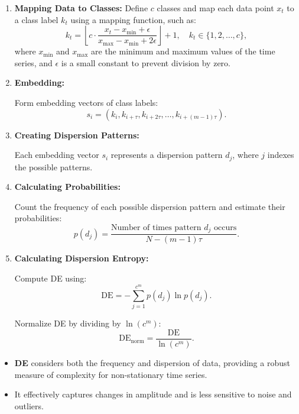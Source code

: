 \begin{enumerate} \item \textbf{Mapping Data to Classes:}
Define $c$ classes and map each data point $x_t$ to a class label $k_t$ using a mapping function, such as:
\begin{equation}
    k_t = \left\lfloor c \cdot \frac{x_t - x_{\min} + \epsilon}{x_{\max} - x_{\min} + 2\epsilon} \right\rfloor + 1, \quad k_t \in \{1, 2, \dots, c\},
\end{equation}
where $x_{\min}$ and $x_{\max}$ are the minimum and maximum values of the time series, and $\epsilon$ is a small constant to prevent division by zero.

\item \textbf{Embedding:}

Form embedding vectors of class labels:
\begin{equation}
    s_i = \left( k_i, k_{i+\tau}, k_{i+2\tau}, \dots, k_{i+(m-1)\tau} \right).
\end{equation}

\item \textbf{Creating Dispersion Patterns:}

Each embedding vector $s_i$ represents a dispersion pattern $d_j$, where $j$ indexes the possible patterns.

\item \textbf{Calculating Probabilities:}

Count the frequency of each possible dispersion pattern and estimate their probabilities:
\begin{equation}
    p(d_j) = \frac{\text{Number of times pattern } d_j \text{ occurs}}{N - (m -1)\tau}.
\end{equation}

\item \textbf{Calculating Dispersion Entropy:}

Compute DE using:
\begin{equation}
    \mathrm{DE} = - \sum_{j=1}^{c^m} p(d_j) \ln p(d_j).
\end{equation}

Normalize DE by dividing by $\ln(c^m)$:
\begin{equation}
    \mathrm{DE}_{\text{norm}} = \frac{\mathrm{DE}}{\ln(c^m)}.
\end{equation}
\end{enumerate}

\begin{itemize} \item \textbf{DE} considers both the frequency and dispersion of data, providing a robust measure of complexity for non-stationary time series. \item It effectively captures changes in amplitude and is less sensitive to noise and outliers. \end{itemize}

